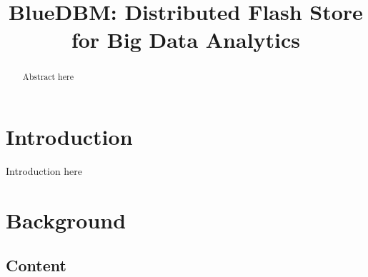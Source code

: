 \documentclass[pageno]{jpaper}
\begin{document}
\title{
BlueDBM: Distributed Flash Store for Big Data Analytics}

\date{}
\maketitle


\begin{abstract}
Abstract here
\end{abstract}

\section{Introduction}

Introduction here

\section{Background}


\subsection{Content}




\end{document}
